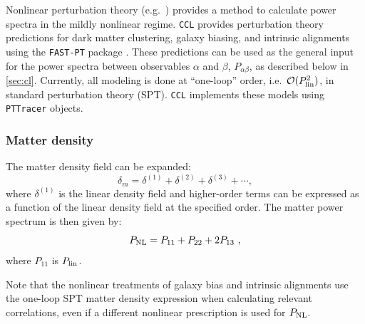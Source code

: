 \documentclass[\docopts]{\docclass}
\newcommand{\ccl}{{\tt CCL}\xspace}
\begin{document}
Nonlinear perturbation theory (e.g.\ \citealp{bernardeau02}) provides a method to calculate power spectra in the mildly nonlinear regime. {\tt CCL} provides perturbation theory predictions for dark matter clustering, galaxy biasing, and intrinsic alignments using the {\tt FAST-PT} package \citep{mcewen16,fang17}. These predictions can be used as the general input for the power spectra between observables $\alpha$ and $\beta$, $P_{\alpha\beta}$, as described below in \ref{sec:cl}. Currently, all modeling is done at ``one-loop'' order, i.e.\ $\mathcal{O}(P_{\rm lin}^2)$, in standard perturbation theory (SPT). \ccl implements these models using {\tt PTTracer} objects.

\subsubsection{Matter density}

The matter density field can be expanded:
\begin{equation}
  \label{eq:delta_spt}
  \delta_m = \delta^{(1)} + \delta^{(2)} + \delta^{(3)} + \cdots,
\end{equation}
where $\delta^{(1)}$ is the linear density field and higher-order terms can be expressed as a function of the linear density field at the specified order. The matter power spectrum is then given by:
\begin{equation}
  P_{\rm NL} = P_{11} + P_{22} + 2P_{13}~,
\end{equation}
where $P_{11}$ is $P_{\rm lin}$.

Note that the nonlinear treatments of galaxy bias and intrinsic alignments use the one-loop SPT matter density expression when calculating relevant correlations, even if a different nonlinear prescription is used for $P_{\rm NL}$.
\end{document}

